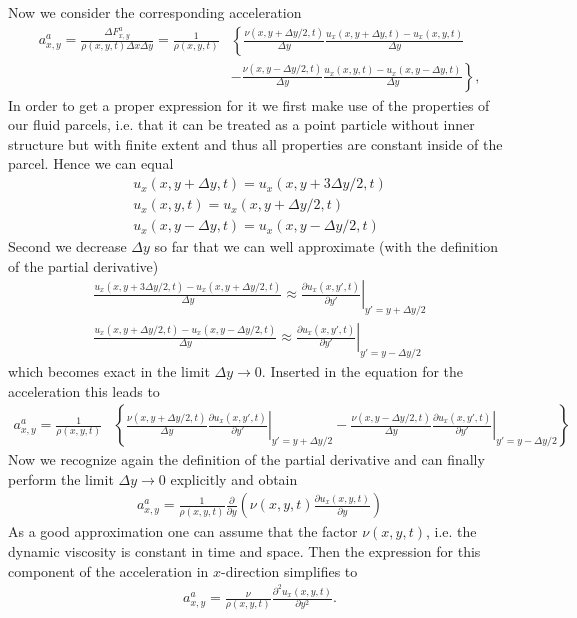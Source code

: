 \documentclass[10pt,a4paper]{article}
\begin{document}
Now we consider the corresponding acceleration
%
\begin{align}
a^a_{x, y} = \frac{\Delta F^a_{x, y}}{\rho(x,y,t)\Delta x \Delta y}  = \frac{1}{\rho(x,y,t)}  & \left \{ \frac{\nu(x, y+\Delta y/2, t)}{\Delta y}    \frac{u_x(x, y+\Delta y, t) - u_x(x, y, t)}{\Delta y} \right. \\
& \left. -  \frac{\nu(x, y-\Delta y/2, t)}{\Delta y} \frac{u_x(x, y, t)-u_x(x, y-\Delta y, t)}{\Delta y} \right\},
\end{align}
%
In order to get a proper expression for it we first make use of the properties of our fluid parcels, i.e. that it can be treated as a point particle without inner structure but with finite extent and thus all properties are constant inside of the parcel.
%
Hence we can equal
%
\begin{align}
u_x(x, y+\Delta y, t) = u_x(x, y+3 \Delta y/2, t) \\
u_x(x, y, t) = u_x(x, y+\Delta y/2, t) \\
u_x(x, y-\Delta y, t) = u_x(x, y-\Delta y/2, t) 
\end{align}
%
Second we decrease $\Delta y$ so far that we can well approximate (with the definition of the partial derivative)
%
\begin{align}
 \frac{u_x(x, y+3\Delta y/2, t) - u_x(x, y+\Delta y/2, t)}{\Delta y} \approx \left. \frac{\partial u_x(x, y', t)}{\partial y'} \right |_{y'=y+\Delta y/2} \\
 \frac{u_x(x, y+\Delta y/2, t)-u_x(x, y-\Delta y/2, t)}{\Delta y} \approx \left. \frac{\partial u_x(x, y', t)}{\partial y'} \right |_{y'=y-\Delta y/2}
\end{align}
%
which becomes exact in the limit $\Delta y \to 0$.
%
Inserted in the equation for the acceleration this leads to
%
\begin{align}
a^a_{x, y}  = \frac{1}{\rho(x,y,t)}  & \left \{ \frac{\nu(x, y+\Delta y/2, t)}{\Delta y}    \left. \frac{\partial u_x(x, y', t)}{\partial y'} \right |_{y'=y+\Delta y/2} -  \frac{\nu(x, y-\Delta y/2, t)}{\Delta y} \left. \frac{\partial u_x(x, y', t)}{\partial y'} \right |_{y'=y-\Delta y/2} \right\}
\end{align}
%
Now we recognize again the definition of the partial derivative and can finally perform the limit $\Delta y \to 0$ explicitly and obtain
%
\begin{align}
 a^a_{x, y}  = \frac{1}{\rho(x,y,t)} \frac{\partial}{\partial y} \left( \nu(x,y,t) \frac{\partial u_x(x, y, t)}{\partial y} \right) 
\end{align}
%
As a good approximation one can assume that the factor $\nu(x,y,t)$, i.e. the dynamic viscosity is constant in time and space.
%
Then the expression for this component of the acceleration in $x$-direction simplifies to
%
%
\begin{align}
a^a_{x, y}  = \frac{\nu}{\rho(x,y,t)} \frac{\partial^2 u_x(x, y, t)}{\partial y^2}  .
\end{align}
\end{document}
